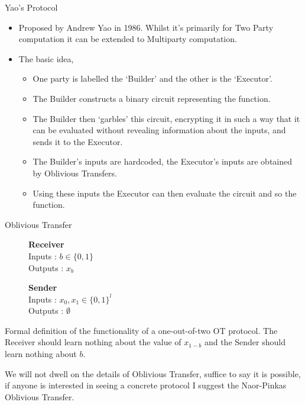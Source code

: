\documentclass[t, 12pt]{beamer}            %
\begin{document}
\begin{frame}{Yao's Protocol}
	\begin{itemize}[<+->]
		\item Proposed by Andrew Yao in 1986. Whilst it's primarily for Two Party computation it can be extended to Multiparty computation.
		\item  The basic idea,
		\begin{itemize}
			\item One party is labelled the `Builder' and the other is the `Executor'.
			\item The Builder constructs a binary circuit representing the function.
			\item The Builder then `garbles' this circuit, encrypting it in such a way that it can be evaluated without revealing information about the inputs, and sends it to the Executor.
			\item The Builder's inputs are hardcoded, the Executor's inputs are obtained by Oblivious Transfers.
			\item Using these inputs the Executor can then evaluate the circuit and so the function.
		\end{itemize}
	\end{itemize}
\end{frame}


\begin{frame}
	\begin{block}{Oblivious Transfer}
		\vspace{0.2cm}
		\begin{figure}[!htb]
			\centering
			\begin{minipage}{0.45\textwidth}
				\centering
			\textbf{Receiver}\\
				Inputs : $b \in \{0, 1\}$\\
				Outputs : $x_b$\\
			\end{minipage}
			\begin{minipage}{0.45\textwidth}
				\centering
				\textbf{Sender}\\
				Inputs : $x_0, x_1 \in \{0, 1\}^l$\\
				Outputs : $\emptyset$\\
			\end{minipage}
		\end{figure}

		Formal definition of the functionality of a one-out-of-two OT protocol. The Receiver should learn nothing about the value of $x_{1-b}$ and the Sender should learn nothing about $b$.
	\end{block}

	We will not dwell on the details of Oblivious Transfer, suffice to say it is possible, if anyone is interested in seeing a concrete protocol I suggest the Naor-Pinkas Oblivious Transfer.
\end{frame}
\end{document}
